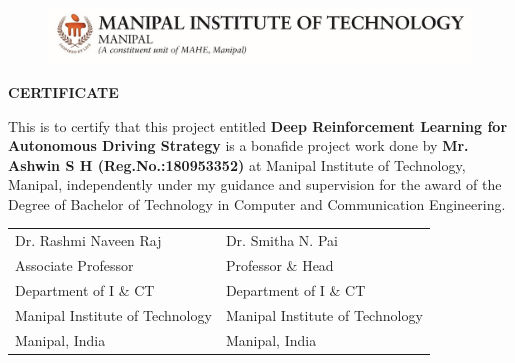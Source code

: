 \begin{figure}[bpht!]
  \begin{center}
	\includegraphics[scale=0.85]{MITLogo}
	\end{center}
	\end{figure}
\begin{center}
\large{\textbf{CERTIFICATE}}\\
\end{center}


This is to certify that this project entitled \textbf{Deep Reinforcement Learning for Autonomous Driving Strategy} is a bonafide project work done by \textbf{Mr. Ashwin S H (Reg.No.:180953352)} at Manipal Institute of Technology, Manipal, independently under my guidance and supervision for the award of the Degree of
Bachelor of Technology in Computer and Communication Engineering.



\vspace{4cm}

\begin{table}[h]
	\centering
		\begin{tabular}{p{3in} p{3in}}
			Dr. Rashmi Naveen Raj &  Dr. Smitha N. Pai  \\
			Associate Professor & Professor \& Head \\
			  Department of I \& CT&  Department of I \& CT \\
			Manipal Institute of Technology  & Manipal Institute of Technology\\
			Manipal, India &  Manipal, India 
		\end{tabular}
\end{table}